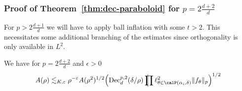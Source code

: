 \subsubsection{Proof of Theorem~\ref{thm:dec-paraboloid} for $p=2\frac{d+2}{d}$}
For $p > 2 \frac{d+1}{d}$ we will have to apply ball inflation with some $t>2$.
This necessitates some additional branching of the estimates since orthogonality is only available in $L^{2}$.
\begin{proposition}
\label{prop:iter}
We have for $p = 2\frac{d+2}{d}$ and $\epsilon>0$
\begin{equation}
\label{eq:iter:high-p}
A(\rho)
\lesssim_{K,\epsilon}
\rho^{-\epsilon} A(\rho^{2})^{1/2}
\Bigl( \Dec_{d}^{p,2}(\delta/\rho) \avprod \ell^{2}_{\theta \in \Part[\alpha_i]{\delta}} \norm{ f_{\theta} }_{p} \Bigr)^{1/2}
\end{equation}
\end{proposition}
